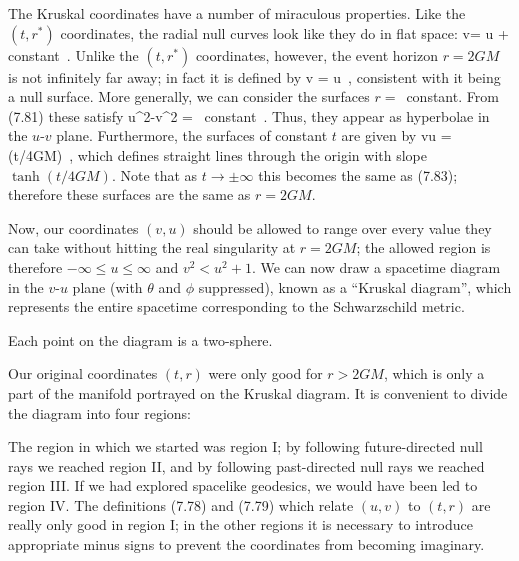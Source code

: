 The Kruskal coordinates have a number of miraculous properties.
Like the $(t,r^*)$ coordinates, the radial null curves look like
they do in flat space:
\be
  v= \pm u + {\rm constant}\ .\label{7.82}
\ee
Unlike the $(t,r^*)$ coordinates, however, the event horizon $r=2GM$ 
is not infinitely far away; in fact it is defined by
\be
  v = \pm u\ ,\label{7.83}
\ee
consistent with it being a null surface.
More generally, we can consider the surfaces $r=$~constant.  From
(7.81) these satisfy
\be
  u^2-v^2 = {\rm ~constant}\ .\label{7.84}
\ee
Thus, they appear as hyperbolae in the $u$-$v$ plane.  Furthermore,
the surfaces of constant $t$ are given by
\be
  {v\over u} = \tanh(t/4GM)\ ,\label{7.85}
\ee
which defines straight lines through the origin with slope
$\tanh(t/4GM)$.  Note that as $t\rightarrow \pm\infty$ this
becomes the same as (7.83); therefore these surfaces are the
same as $r=2GM$.   

Now, our coordinates $(v,u)$ should be allowed to
range over every value they can take without hitting the real
singularity at $r=2GM$; the allowed region is therefore
$-\infty \leq u \leq \infty$ and $v^2 < u^2+1$.  We can now draw
a spacetime diagram in the $v$-$u$ plane (with $\theta$ and $\phi$
suppressed), known as a ``Kruskal diagram'', which represents the
entire spacetime corresponding to the Schwarzschild metric.

\begin{figure}[h]
  \centerline{
  }
\end{figure}

\noindent Each point on the diagram is a two-sphere.

\eject

Our original coordinates $(t,r)$ were only good for $r>2GM$, which is
only a part of the manifold portrayed on the Kruskal diagram.  It is
convenient to divide the diagram into four regions:

\begin{figure}[h]
  \centerline{
  }
\end{figure}

\noindent The region in which we started was region I; by following
future-directed null rays we reached region II, and by following
past-directed null rays we reached region III.  If we had explored
spacelike geodesics, we would have been led to region IV.
The definitions (7.78) and (7.79) which relate $(u,v)$ to $(t,r)$
are really only good in region I; in the other regions it is 
necessary to introduce appropriate minus signs to prevent the
coordinates from becoming imaginary.

